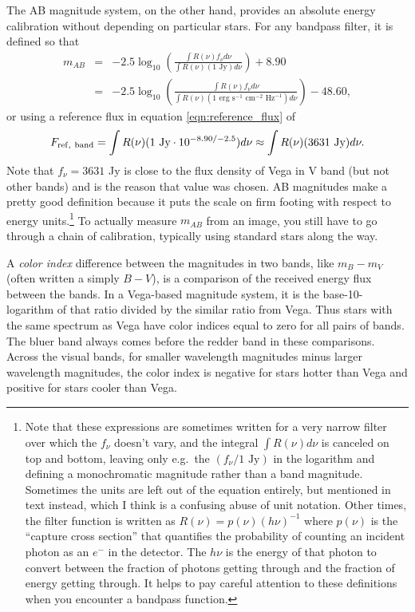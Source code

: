 The AB magnitude system, on the other hand, provides an absolute energy calibration without depending on particular stars.
For any bandpass filter, it is defined so that
\begin{eqnarray}
  m_{AB} &=& -2.5 \log_{10} \left( \frac{\int R(\nu) f_\nu d\nu}{\int R(\nu) (1\mbox{ Jy})  d\nu} \right) + 8.90 \\
  &=&  -2.5 \log_{10} \left( \frac{\int R(\nu) f_\nu d\nu}{\int R(\nu) (1\mbox{ erg s}^{-1}\mbox{ cm}^{-2}\mbox{ Hz}^{-1}) d\nu}  \right) - 48.60, \nonumber
\end{eqnarray}
or
using a reference flux in equation \ref{eqn:reference_flux} of
\begin{equation}
  F_{{\rm ref,\ band}} = \int R(\nu) (1 \mbox{ Jy} \cdot 10^{-8.90/-2.5}) d\nu \approx \int R(\nu) (3631 \mbox{ Jy}) d\nu.
\end{equation}
Note that $f_\nu = 3631$ Jy is close to the flux density of Vega in V band (but not other bands) and is the reason that value was chosen.  AB magnitudes make a pretty good definition because it puts the scale on firm footing with respect to energy units.\footnote{Note that these expressions are sometimes written for a very narrow filter over which the $f_\nu$ doesn't vary, and the integral $\int R(\nu) d\nu$ is canceled on top and bottom, leaving only e.g.\ the $(f_\nu/1\mbox{ Jy})$ in the logarithm and defining a monochromatic magnitude rather than a band magnitude.  Sometimes the units are left out of the equation entirely, but mentioned in text instead, which I think is a confusing abuse of unit notation.  Other times, the filter function is written as $R(\nu) =  p(\nu) (h\nu)^{-1}$ where $p(\nu)$ is the ``capture cross section'' that quantifies the probability of counting an incident photon as an $e^-$ in the detector.  The $h\nu$ is the energy of that photon to convert between the fraction of photons getting through and the fraction of energy getting through.  It helps to pay careful attention to these definitions when you encounter a bandpass function.}
To actually measure $m_{AB}$ from an image, you still have to go through a chain of calibration, typically using standard stars along the way.

A \textit{color index} difference between the magnitudes in two bands, like $m_B-m_V$ (often written a simply $B-V$), is a comparison of the received energy flux between the bands.  In a Vega-based magnitude system, it is the base-10-logarithm of that ratio divided by the similar ratio from Vega.  Thus stars with the same spectrum as Vega have color indices equal to zero for all pairs of bands.  The bluer band always comes before the redder band in these comparisons.  Across the visual bands, for smaller wavelength magnitudes minus larger wavelength magnitudes, the color index is negative for stars hotter than Vega and positive for stars cooler than Vega.

